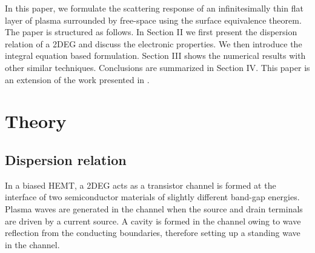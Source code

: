 \documentclass{ieeeaccess}
\renewcommand{\^}{\hat}  %
\begin{document}
In this paper, we formulate the scattering response of an infinitesimally thin flat layer of plasma surrounded by free-space using the surface equivalence theorem. The paper is structured as follows. In Section II we first present the dispersion relation of a 2DEG and discuss the electronic properties. We then introduce the integral equation based formulation. Section III shows the numerical results with other similar techniques. Conclusions are summarized in Section IV. This paper is an extension of the work presented in \cite{abbas2017integral,abbas2018electromagnetic}. 

\section{Theory}
\subsection{Dispersion relation}
% 
In a biased HEMT, a 2DEG acts as a transistor channel is formed at the interface of two semiconductor materials of slightly different band-gap energies. Plasma waves are generated in the channel when the source and drain terminals are driven by a current source. A cavity is formed in the channel owing to wave reflection from the conducting boundaries, therefore setting up a standing wave in the channel.
\end{document}
